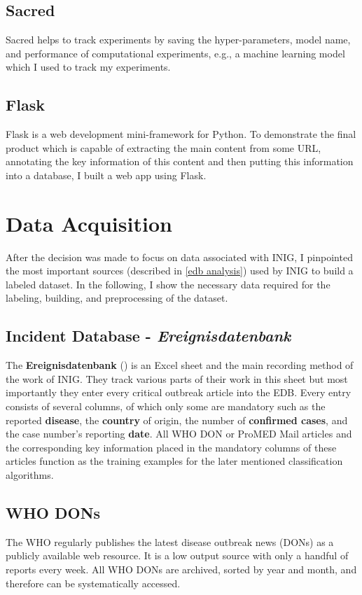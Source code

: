 \subsection{Sacred}
  Sacred helps to track experiments by saving the hyper-parameters, model name, and performance of computational experiments, e.g., a machine learning model which I used to track my experiments.

\subsection{Flask}
  Flask is a web development mini-framework for Python.
  To demonstrate the final product which is capable of extracting the main content from some URL, annotating the key information of this content and then putting this information into a database, I built a web app using Flask.

\section{Data Acquisition}
  After the decision was made to focus on data associated with INIG, I pinpointed the most important sources (described in \ref{edb analysis}) used by INIG to build a labeled dataset.
  In the following, I show the necessary data required for the labeling, building, and preprocessing of the dataset.

\subsection{Incident Database - \textit{Ereignisdatenbank}}
  The \textbf{Ereignisdatenbank} () is an Excel sheet and the main recording method of the work of INIG.
  They track various parts of their work in this sheet but most importantly they enter every critical outbreak article into the EDB.
  Every entry consists of several columns, of which only some are mandatory such as the reported \textbf{disease}, the \textbf{country} of origin, the number of \textbf{confirmed cases}, and the case number's reporting \textbf{date}.
  All WHO DON or ProMED Mail articles and the corresponding key information placed in the mandatory columns of these articles function as the training examples for the later mentioned classification algorithms.

\subsection{WHO DONs}
  The WHO regularly publishes the latest disease outbreak news (DONs) as a publicly available web resource.
  It is a low output source with only a handful of reports every week.
  All WHO DONs are archived, sorted by year and month, and therefore can be systematically accessed.

